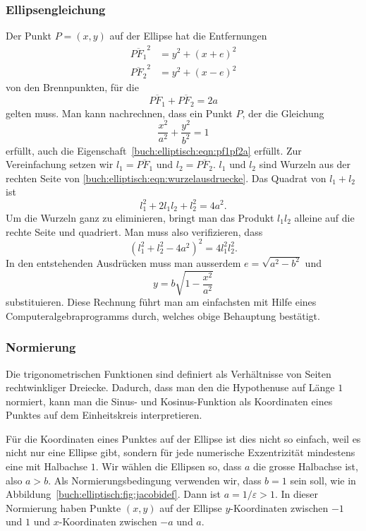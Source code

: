 %
%
\subsubsection{Ellipsengleichung}
Der Punkt $P=(x,y)$ auf der Ellipse hat die Entfernungen
\begin{equation}
\begin{aligned}
\overline{PF_1}^2
&=
y^2 + (x+e)^2
\\
\overline{PF_2}^2
&=
y^2 + (x-e)^2
\end{aligned}
\label{buch:elliptisch:eqn:wurzelausdruecke}
\end{equation}
von den Brennpunkten, für die 
\begin{equation}
\overline{PF_1}+\overline{PF_2}
=
2a
\label{buch:elliptisch:eqn:pf1pf2a}
\end{equation}
gelten muss.
Man kann nachrechnen, dass ein Punkt $P$, der die Gleichung
\[
\frac{x^2}{a^2} + \frac{y^2}{b^2}=1
\]
erfüllt, auch die Eigenschaft~\eqref{buch:elliptisch:eqn:pf1pf2a}
erfüllt.
Zur Vereinfachung setzen wir $l_1=\overline{PF_1}$ und $l_2=\overline{PF_2}$.
$l_1$ und $l_2$ sind Wurzeln aus der rechten Seite von
\eqref{buch:elliptisch:eqn:wurzelausdruecke}.
Das Quadrat von $l_1+l_2$ ist
\[
l_1^2 + 2l_1l_2 + l_2^2 = 4a^2.
\]
Um die Wurzeln ganz zu eliminieren, bringt man das Produkt $l_1l_2$ alleine
auf die rechte Seite und quadriert.
Man muss also verifizieren, dass
\[
(l_1^2 + l_2^2 -4a^2)^2 = 4l_1^2l_2^2.
\]
In den entstehenden Ausdrücken muss man ausserdem $e=\sqrt{a^2-b^2}$ und
\[
y=b\sqrt{1-\frac{x^2}{a^2}}
\]
substituieren.
Diese Rechnung führt man am einfachsten mit Hilfe eines
Computeralgebraprogramms durch, welches obige Behauptung bestätigt.

%
%
\subsubsection{Normierung}
Die trigonometrischen Funktionen sind definiert als Verhältnisse 
von Seiten rechtwinkliger Dreiecke.
Dadurch, dass man den die Hypothenuse auf Länge $1$ normiert, 
kann man die Sinus- und Kosinus-Funktion als Koordinaten eines
Punktes auf dem Einheitskreis interpretieren.

Für die Koordinaten eines Punktes auf der Ellipse ist dies nicht so einfach,
weil es nicht nur eine Ellipse gibt, sondern für jede numerische Exzentrizität
mindestens eine mit Halbachse $1$.
Wir wählen die Ellipsen so, dass $a$ die grosse Halbachse ist, also $a>b$.
Als Normierungsbedingung verwenden wir, dass $b=1$ sein soll, wie in
Abbildung~\ref{buch:elliptisch:fig:jacobidef}.
Dann ist $a=1/\varepsilon>1$.
In dieser Normierung haben Punkte $(x,y)$ auf der Ellipse $y$-Koordinaten
zwischen $-1$ und $1$ und $x$-Koordinaten zwischen $-a$ und $a$.


